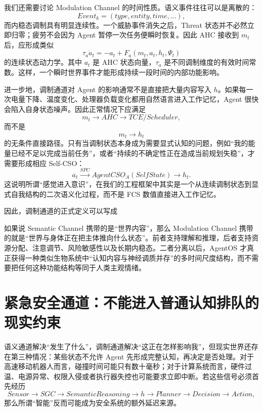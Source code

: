 我们还需要讨论 Modulation Channel 的时间性质。语义事件往往可以是离散的：
\[
Event_k=(type,entity,time,\ldots),
\]
而内稳态调制具有明显连续性。一个威胁事件消失之后，Threat 状态并不必然立即归零；疲劳不会因为 Agent 暂停一次任务便瞬时恢复。因此 AHC 接收到 $m_t$ 后，应形成类似
\[
\tau_a\dot a_t
=
-a_t
+
F_a
\left(
m_t,
a_t,
h_t,
\Psi_t
\right)
\]
的连续状态动力学。其中 $a_t$ 是 AHC 状态向量，$\tau_a$ 是不同调制维度的有效时间常数。这样，一个瞬时世界事件才能形成持续一段时间的内部功能影响。

进一步地，调制通道对 Agent 的影响通常不是直接把大量内容写入 $h$。如果每一次电量下降、温度变化、处理器负载变化都用自然语言进入工作记忆，Agent 很快会陷入自身状态噪声。因此正常情况下应满足
\[
m_t
\rightarrow
AHC
\rightarrow
TCE/Scheduler,
\]
而不是
\[
m_t
\rightarrow
h_t
\]
的无条件直接路径。只有当调制状态本身成为需要显式认知的问题，例如“我的能量已经不足以完成当前任务”，或者“持续的不确定性正在造成当前规划失稳”，才需要形成相应 Self-CSO：
\[
a_t
\xrightarrow{SPC}
AgentCSO_A(SelfState)
\rightarrow
h_t.
\]
这说明所谓“感觉进入意识”，在我们的工程框架中其实是一个从连续调制状态到显式自我结构的二次语义化过程，而不是 FCS 数值直接进入工作记忆。

因此，调制通道的正式定义可以写成
\begin{statementbox}
\centering
{}
\end{statementbox}
如果说 Semantic Channel 携带的是“世界内容”，那么 Modulation Channel 携带的就是“世界与身体正在把主体推向什么状态”。前者支持理解和推理，后者支持资源分配、注意调节、风险敏感性以及长期内稳态。二者分离以后，AgentOS 才真正获得一种类似生物系统中“认知内容与神经调质并存”的多时间尺度结构，而不需要把任何这种功能结构等同于人类主观情绪。

\section{紧急安全通道：不能进入普通认知排队的现实约束}
\label{sec:emergency-channel}

语义通道解决“发生了什么”，调制通道解决“这正在怎样影响我”，但现实世界还存在第三种情况：某些状态不允许 Agent 先形成完整认知，再决定是否处理。对于高速移动机器人而言，碰撞时间可能只有数十毫秒；对于计算系统而言，硬件过温、电源异常、权限入侵或者执行器失控也可能要求立即中断。若这些信号必须首先经历
\[
Sensor
\rightarrow
SGC
\rightarrow
SemanticReasoning
\rightarrow
h
\rightarrow
Planner
\rightarrow
Decision
\rightarrow
Action,
\]
那么所谓“智能”反而可能成为安全系统的额外延迟来源。

